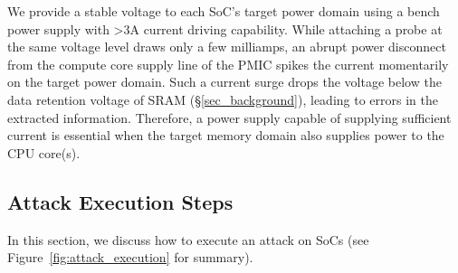 We provide a stable voltage to each SoC's target power domain using a bench power supply with >3A current driving capability. 
While attaching a probe at the same voltage level draws only a few milliamps, an abrupt power disconnect from the compute core supply line of the PMIC spikes the current momentarily on the target power domain. 
Such a current surge drops the voltage below the data retention voltage of SRAM (\S\ref{sec_background}), leading to errors in the extracted information. 
Therefore, a power supply capable of supplying sufficient current is essential when the target memory domain also supplies power to the CPU core(s).

\subsection{Attack Execution Steps}
\label{sub_sec_attack_steps}

In this section, we discuss how to execute an attack on SoCs (see Figure~\ref{fig:attack_execution} for summary). 


